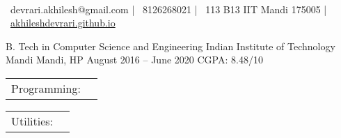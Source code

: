 \documentclass[]{awesome-cv}
\begin{document}
    
\begin{center}
	  \\
	\vspace{2mm}
	{\faEnvelope\ devrari.akhilesh@gmail.com} | {\faMobile\ 8126268021} | {\faMapMarker\ 113 B13 IIT Mandi 175005} | {\faLink\ \href{https://akhileshdevrari.github.io/}{akhileshdevrari.github.io}}
\end{center}

\vspace{1mm}
\begin{cventries}
	\cventry
	{B. Tech in Computer Science and Engineering}
	{Indian Institute of Technology Mandi}
	{Mandi, HP}
	{August 2016 – June 2020}
	{CGPA: 8.48/10}
\end{cventries}


\begin{cventries}
	\vspace{-4mm}
	\cventry
	{}
	{\def\arraystretch{1.15}{\begin{tabular}{ l l }
		Programming:  & {\skill{ Comfortable: C/C++, Javascript \hspace{1cm} Less experience: PHP, Python}} \\
		\end{tabular}}}
	{}
	{}
	{}
	
	\vspace{-10mm}
	\cventry
	{}
	{\def\arraystretch{1.15}{\begin{tabular}{ l l }
			Utilities:  & {\skill{ MySQL, Git, Linux shell utilities, HTML/CSS}} \\
		\end{tabular}}}
	{}
	{}
	{}
\end{cventries}
\end{document}
